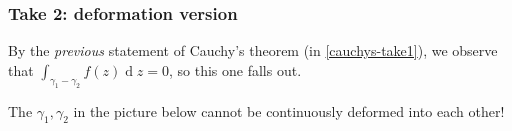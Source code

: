 \documentclass[12pt]{article}
\renewcommand{\d}{\ensuremath{\operatorname{d}}}
\begin{document}
\subsubsection{Take 2: deformation version}
By the \textit{previous} statement of Cauchy's theorem (in \cref{cauchys-take1}), we observe that $\int_{\gamma_1-\gamma_2}f(z)\d z=0$, so this one falls out.

\noneg The $\gamma_1,\gamma_2$ in the picture below cannot be continuously deformed into each other!
\end{document}
